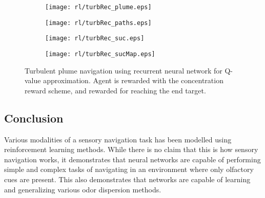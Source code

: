 \documentclass[../dissertation.tex]{subfiles}
\begin{document}
\begin{figure}[p]
    \centering

    \begin{subfigure}[b]{0.45\textwidth}
        \texttt{[image: rl/turbRec\_plume.eps]}
        \label{fig:turb_plume}
    \end{subfigure}
    \hfill
    \begin{subfigure}[b]{0.45\textwidth}
        \texttt{[image: rl/turbRec\_paths.eps]}
        \label{fig:turb_testPath}
    \end{subfigure}

    \begin{subfigure}[h]{0.60\textwidth}
        \texttt{[image: rl/turbRec\_suc.eps]}
        \label{fig:turb_suc}
    \end{subfigure}
    \hfill
    \begin{subfigure}[h]{0.30\textwidth}
        \texttt{[image: rl/turbRec\_sucMap.eps]}
        \label{fig:turb_heatmap}
    \end{subfigure}
       
    \caption{Turbulent plume navigation using recurrent neural network for Q-value approximation. Agent is rewarded with the concentration reward scheme, and rewarded for reaching the end target.}
    \label{fig:turb_results}
\end{figure}

\subsection{Conclusion}

Various modalities of a sensory navigation task has been modelled using reinforcement learning methods.
While there is no claim that this is how sensory navigation works, it demonstrates that neural networks are capable of performing simple and complex tasks of navigating in an environment where only olfactory cues are present.
This also demonstrates that networks are capable of learning and generalizing various odor dispersion methods.
\end{document}
